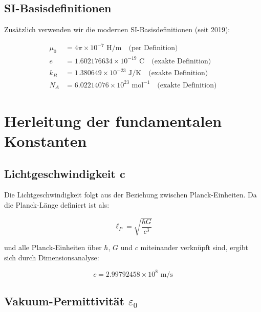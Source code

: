 \documentclass[12pt,a4paper]{article}
\theoremstyle{definition}
\begin{document}
	\subsection{SI-Basisdefinitionen}
	
	Zus\"atzlich verwenden wir die modernen SI-Basisdefinitionen (seit 2019):
	
	\begin{align}
		\mu_0 &= 4\pi \times 10^{-7} \text{ H/m} \quad \text{(per Definition)}\\
		e &= 1.602176634 \times 10^{-19} \text{ C} \quad \text{(exakte Definition)}\\
		k_B &= 1.380649 \times 10^{-23} \text{ J/K} \quad \text{(exakte Definition)}\\
		N_A &= 6.02214076 \times 10^{23} \text{ mol}^{-1} \quad \text{(exakte Definition)}
	\end{align}
	
	\section{Herleitung der fundamentalen Konstanten}
	
	\subsection{Lichtgeschwindigkeit c}
	
	Die Lichtgeschwindigkeit folgt aus der Beziehung zwischen Planck-Einheiten. Da die Planck-L\"ange definiert ist als:
	
	\begin{equation}
		\ell_P = \sqrt{\frac{\hbar G}{c^3}}
	\end{equation}
	
	und alle Planck-Einheiten \"uber $\hbar$, $G$ und $c$ miteinander verkn\"upft sind, ergibt sich durch Dimensionsanalyse:
	
	\begin{tcolorbox}[colback=green!5!white,colframe=green!75!black,title=Lichtgeschwindigkeit]
		\begin{equation}
			\boxed{c = 2.99792458 \times 10^8 \text{ m/s}}
		\end{equation}
	\end{tcolorbox}
	
	\subsection{Vakuum-Permittivit\"at $\varepsilon_0$}
	
\end{document}
